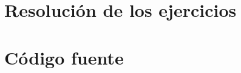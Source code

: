 \documentclass[11pt,a4paper]{article}
\begin{document}
		

	\section{Resolución de los ejercicios}
		
	
	\section{Código fuente}
%		
\end{document}
